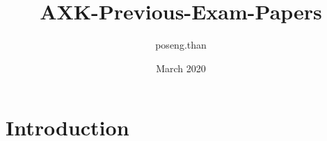 \documentclass{article}
\title{AXK-Previous-Exam-Papers}
\author{poseng.than }
\date{March 2020}
\begin{document}
\maketitle

\section{Introduction}
\end{document}

